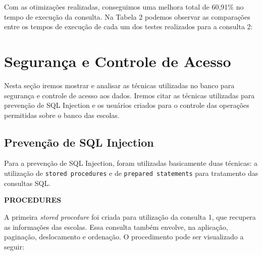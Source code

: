 \documentclass[12pt,a4paper]{article}
\begin{document}
Com as otimizações realizadas, conseguimos uma melhora total de 60,91\% no tempo de execução da consulta. Na Tabela 2 podemos observar as comparações entre os tempos de execução de cada um dos testes realizados para a consulta 2:

\begin{table}[htbp]
  \centering
  \caption{Comparação - Consulta 2}
  \label{tab:addlabel}%
\end{table}%


\section{Segurança e Controle de Acesso}

Nesta seção iremos mostrar e analisar as técnicas utilizadas no banco para segurança e controle de acesso aos dados. Iremos citar as técnicas utilizadas para prevenção de SQL Injection e os usuários criados para o controle das operações permitidas sobre o banco das escolas.

\subsection{Prevenção de SQL Injection}

Para a prevenção de SQL Injection, foram utilizadas basicamente duas técnicas: a utilização de \texttt{stored procedures} e de \texttt{prepared statements} para tratamento das consultas SQL.

\begin{flushleft}
\textbf{PROCEDURES}\\
\end{flushleft}

A primeira \textit{stored procedure} foi criada para utilização da consulta 1, que recupera as informações das escolas. Essa consulta também envolve, na aplicação, paginação, deslocamento e ordenação. O procedimento pode ser visualizado a seguir:
\end{document}
